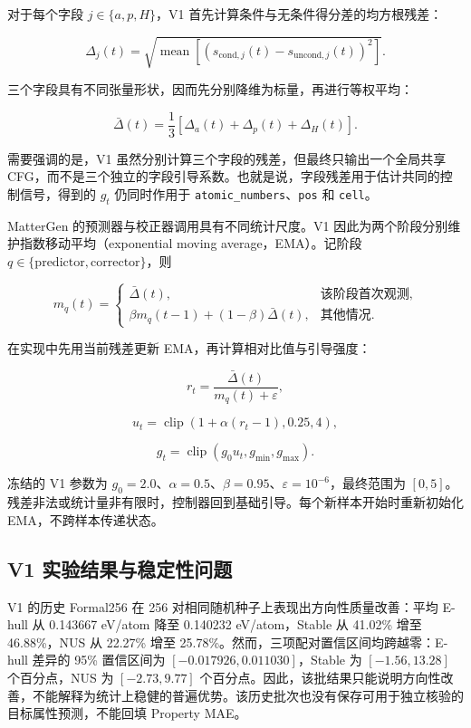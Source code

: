 对于每个字段 \(j\in\{a,p,H\}\)，V1 首先计算条件与无条件得分差的均方根残差：

\[
\Delta_j(t)=
\sqrt{\operatorname{mean}\left[
\left(s_{\mathrm{cond},j}(t)-s_{\mathrm{uncond},j}(t)\right)^2
\right]}.
\]

三个字段具有不同张量形状，因而先分别降维为标量，再进行等权平均：

\[
\bar\Delta(t)=\frac{1}{3}
\left[\Delta_a(t)+\Delta_p(t)+\Delta_H(t)\right].
\]

需要强调的是，V1 虽然分别计算三个字段的残差，但最终只输出一个全局共享 CFG，而不是三个独立的字段引导系数。也就是说，字段残差用于估计共同的控制信号，得到的 \(g_t\) 仍同时作用于 \texttt{atomic\_numbers}、\texttt{pos} 和 \texttt{cell}。

MatterGen 的预测器与校正器调用具有不同统计尺度。V1 因此为两个阶段分别维护指数移动平均（exponential moving average，EMA）。记阶段 \(q\in\{\mathrm{predictor},\mathrm{corrector}\}\)，则

\[
m_q(t)=
\begin{cases}
\bar\Delta(t), & \text{该阶段首次观测},\\
\beta m_q(t-1)+(1-\beta)\bar\Delta(t), & \text{其他情况}.
\end{cases}
\]

在实现中先用当前残差更新 EMA，再计算相对比值与引导强度：

\[
r_t=\frac{\bar\Delta(t)}{m_q(t)+\varepsilon},
\]

\[
u_t=\operatorname{clip}\left(1+\alpha(r_t-1),0.25,4\right),
\]

\[
g_t=\operatorname{clip}\left(g_0u_t,g_{\min},g_{\max}\right).
\]

冻结的 V1 参数为 \(g_0=2.0\)、\(\alpha=0.5\)、\(\beta=0.95\)、\(\varepsilon=10^{-6}\)，最终范围为 \([0,5]\)。残差非法或统计量非有限时，控制器回到基础引导。每个新样本开始时重新初始化 EMA，不跨样本传递状态。

\subsection{V1 实验结果与稳定性问题}

V1 的历史 Formal256 在 256 对相同随机种子上表现出方向性质量改善：平均 E-hull 从 0.143667 eV/atom 降至 0.140232 eV/atom，Stable 从 41.02\% 增至 46.88\%，NUS 从 22.27\% 增至 25.78\%。然而，三项配对置信区间均跨越零：E-hull 差异的 95\% 置信区间为 \([-0.017926,0.011030]\)，Stable 为 \([-1.56,13.28]\) 个百分点，NUS 为 \([-2.73,9.77]\) 个百分点。因此，该批结果只能说明方向性改善，不能解释为统计上稳健的普遍优势。该历史批次也没有保存可用于独立核验的目标属性预测，不能回填 Property MAE。

